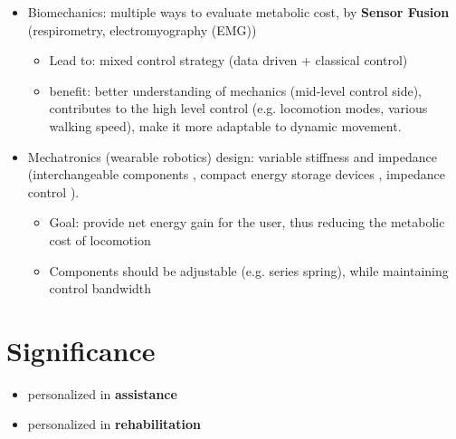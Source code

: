 \documentclass[8pt]{article}
\begin{document}
\begin{itemize}
    \item Biomechanics: multiple ways to evaluate metabolic cost, by \textbf{Sensor Fusion} (respirometry, electromyography (EMG))
    \begin{itemize}
        \item Lead to: mixed control strategy (data driven + classical control)
        \item benefit: better understanding of mechanics (mid-level control side), contributes to the high level control (e.g. locomotion modes, various walking speed), make it more adaptable to dynamic movement.    
    \end{itemize}
    \item Mechatronics (wearable robotics) design: variable stiffness and impedance (interchangeable components \cite{ProsthesisOverview}, compact energy storage devices \cite{OSLSpring}, impedance control \cite{VariableMecheSys}). 
    \begin{itemize}
        \item Goal: provide net energy gain for the user, thus reducing the metabolic cost of locomotion
        \item Components should be adjustable (e.g. series spring), while maintaining control bandwidth \cite{SEABandwidth}
    \end{itemize}
\end{itemize}

\section{Significance}

\begin{itemize}
    \item personalized in \textbf{assistance}
    \item personalized in \textbf{rehabilitation}
\end{itemize}



\end{document}
